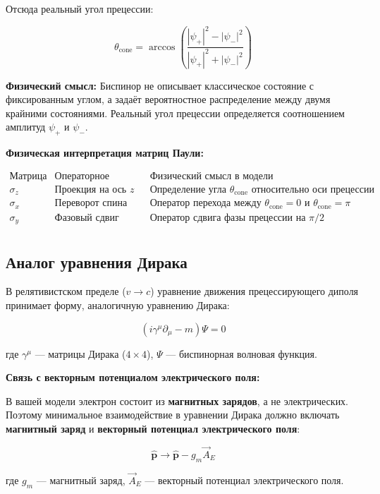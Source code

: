 \documentclass[12pt]{article}
\begin{document}
Отсюда реальный угол прецессии:

\begin{equation}
\theta_{\text{cone}} = \arccos\left( \frac{|\psi_+|^2 - |\psi_-|^2}{|\psi_+|^2 + |\psi_-|^2} \right)
\label{eq:theta_from_psi}
\end{equation}

\textbf{Физический смысл:} Биспинор не описывает классическое состояние с фиксированным углом, а задаёт вероятностное распределение между двумя крайними состояниями. Реальный угол прецессии определяется соотношением амплитуд $\psi_+$ и $\psi_-$.

\textbf{Физическая интерпретация матриц Паули:}

\[
\begin{array}{c|c|c}
\textbf{Матрица} & \textbf{Операторное действие} & \textbf{Физический смысл в модели} \\
\hline
\sigma_z & \text{Проекция на ось } z & \text{Определение угла } \theta_{\text{cone}} \text{ относительно оси прецессии} \\
\sigma_x & \text{Переворот спина} & \text{Оператор перехода между } \theta_{\text{cone}} = 0 \text{ и } \theta_{\text{cone}} = \pi \\
\sigma_y & \text{Фазовый сдвиг} & \text{Оператор сдвига фазы прецессии на } \pi/2 \\
\end{array}
\]

\subsection{Аналог уравнения Дирака}

В релятивистском пределе ($v \to c$) уравнение движения прецессирующего диполя принимает форму, аналогичную уравнению Дирака:

\[
(i\gamma^\mu \partial_\mu - m)\Psi = 0
\]

где $\gamma^\mu$ — матрицы Дирака ($4 \times 4$), $\Psi$ — биспинорная волновая функция.

\textbf{Связь с векторным потенциалом электрического поля:}

В вашей модели электрон состоит из \textbf{магнитных зарядов}, а не электрических. Поэтому минимальное взаимодействие в уравнении Дирака должно включать \textbf{магнитный заряд} и \textbf{векторный потенциал электрического поля}:

\[
\hat{\boldsymbol{p}} \to \hat{\boldsymbol{p}} - g_m \vec{A}_E
\]

где $g_m$ — магнитный заряд, $\vec{A}_E$ — векторный потенциал электрического поля.
\end{document}
